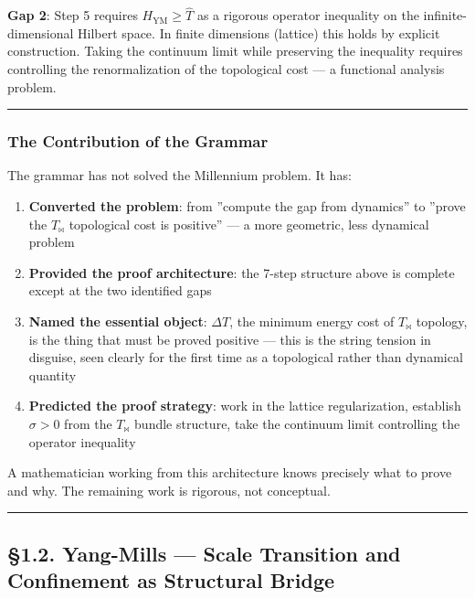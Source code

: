 \documentclass[12pt,a4paper]{article}
\newcommand{\pilcrow}{\S}
\begin{document}
\textbf{Gap 2}: Step 5 requires $H_{\text{YM}} \ge \hat{T}$ as a rigorous operator inequality on the infinite-dimensional Hilbert space. In finite dimensions (lattice) this holds by explicit construction. Taking the continuum limit while preserving the inequality requires controlling the renormalization of the topological cost --- a functional analysis problem.

\begin{center}
\rule{0.5\textwidth}{0.4pt}
\end{center}

\subsubsection{The Contribution of the Grammar}

The grammar has not solved the Millennium problem. It has:

\begin{enumerate}
    \item \textbf{Converted the problem}: from ''compute the gap from dynamics'' to ''prove the $T_{\bowtie}$ topological cost is positive'' --- a more geometric, less dynamical problem
    \item \textbf{Provided the proof architecture}: the 7-step structure above is complete except at the two identified gaps
    \item \textbf{Named the essential object}: $\Delta{T}$, the minimum energy cost of $T_{\bowtie}$ topology, is the thing that must be proved positive --- this is the string tension in disguise, seen clearly for the first time as a topological rather than dynamical quantity
    \item \textbf{Predicted the proof strategy}: work in the lattice regularization, establish $\sigma > 0$ from the $T_{\bowtie}$ bundle structure, take the continuum limit controlling the operator inequality
\end{enumerate}

A mathematician working from this architecture knows precisely what to prove and why. The remaining work is rigorous, not conceptual.

\begin{center}
\rule{0.5\textwidth}{0.4pt}
\end{center}

\subsection{\pilcrow{}1.2. Yang-Mills --- Scale Transition and Confinement as Structural Bridge}
\end{document}
